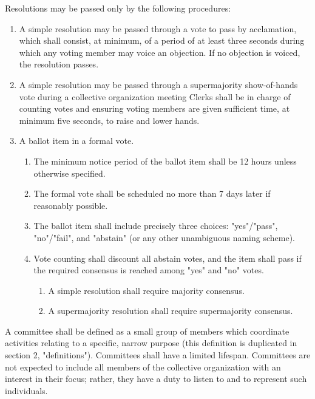 \documentclass[11pt]{article}
\newcounter{h1}
\newcounter{h2}[h1]
\newcounter{h3}[h2]
\begin{document}

Resolutions may be passed only by the following procedures:

\begin{enumerate}
  \item A simple resolution may be passed through a vote to pass by acclamation, which shall consist, at minimum, of a period of at least three seconds during which any voting member may voice an objection. If no objection is voiced, the resolution passes.  
  \item A simple resolution may be passed through a supermajority show-of-hands vote during a collective organization meeting Clerks shall be in charge of counting votes and ensuring voting members are given sufficient time, at minimum five seconds, to raise and lower hands.  
  \item A ballot item in a formal vote.  
  \begin{enumerate}
    \item  The minimum notice period of the ballot item shall be 12 hours unless otherwise specified.  
    \item The formal vote shall be scheduled no more than 7 days later if reasonably possible.  
    \item The ballot item shall include precisely three choices: "yes"/"pass", "no"/"fail", and "abstain" (or any other unambiguous naming scheme).  
    \item Vote counting shall discount all abstain votes, and the item shall pass if the required consensus is reached among "yes" and "no" votes.  
    \begin{enumerate}
      \item A simple resolution shall require majority consensus.  
      \item A supermajority resolution shall require supermajority consensus.
    \end{enumerate}
  \end{enumerate}
\end{enumerate}



A committee shall be defined as a small group of members which coordinate activities relating to a specific, narrow purpose (this definition is duplicated in section 2, "definitions"). Committees shall have a limited lifespan. Committees are not expected to include all members of the collective organization with an interest in their focus; rather, they have a duty to listen to and to represent such individuals.
\end{document}
